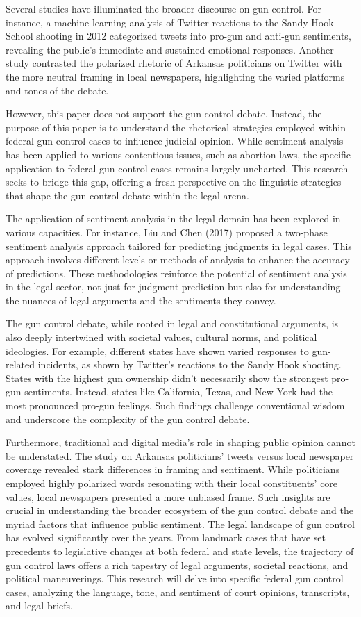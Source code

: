 \documentclass[conference]{IEEEtran}
\begin{document}
Several studies have illuminated the broader discourse on gun control. For instance, a machine learning analysis of Twitter reactions to the Sandy Hook School shooting in 2012 categorized tweets into pro-gun and anti-gun sentiments, revealing the public's immediate and sustained emotional responses. Another study contrasted the polarized rhetoric of Arkansas politicians on Twitter with the more neutral framing in local newspapers, highlighting the varied platforms and tones of the debate.

However, this paper does not support the gun control debate. Instead, the purpose of this paper is to understand the rhetorical strategies employed within federal gun control cases to influence judicial opinion. While sentiment analysis has been applied to various contentious issues, such as abortion laws, the specific application to federal gun control cases remains largely uncharted. This research seeks to bridge this gap, offering a fresh perspective on the linguistic strategies that shape the gun control debate within the legal arena.

The application of sentiment analysis in the legal domain has been explored in various capacities. For instance, Liu and Chen (2017) proposed a two-phase sentiment analysis approach tailored for predicting judgments in legal cases. This approach involves different levels or methods of analysis to enhance the accuracy of predictions. These methodologies reinforce the potential of sentiment analysis in the legal sector, not just for judgment prediction but also for understanding the nuances of legal arguments and the sentiments they convey.

The gun control debate, while rooted in legal and constitutional arguments, is also deeply intertwined with societal values, cultural norms, and political ideologies. For example, different states have shown varied responses to gun-related incidents, as shown by Twitter's reactions to the Sandy Hook shooting. States with the highest gun ownership didn't necessarily show the strongest pro-gun sentiments. Instead, states like California, Texas, and New York had the most pronounced pro-gun feelings. Such findings challenge conventional wisdom and underscore the complexity of the gun control debate.

Furthermore, traditional and digital media's role in shaping public opinion cannot be understated. The study on Arkansas politicians' tweets versus local newspaper coverage revealed stark differences in framing and sentiment. While politicians employed highly polarized words resonating with their local constituents' core values, local newspapers presented a more unbiased frame. Such insights are crucial in understanding the broader ecosystem of the gun control debate and the myriad factors that influence public sentiment. The legal landscape of gun control has evolved significantly over the years. From landmark cases that have set precedents to legislative changes at both federal and state levels, the trajectory of gun control laws offers a rich tapestry of legal arguments, societal reactions, and political maneuverings. This research will delve into specific federal gun control cases, analyzing the language, tone, and sentiment of court opinions, transcripts, and legal briefs.
\end{document}
